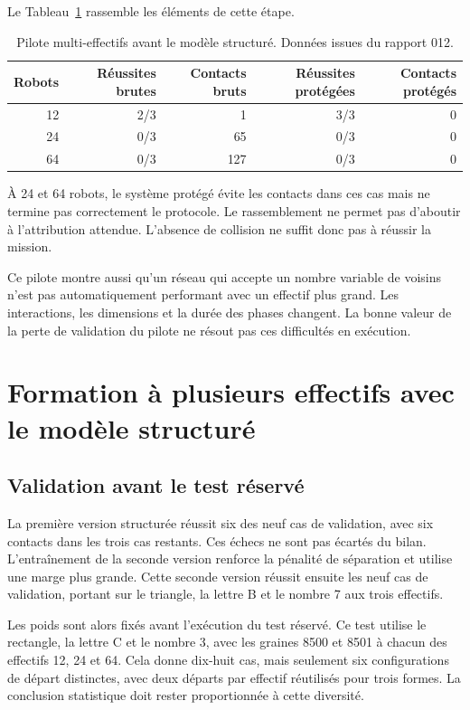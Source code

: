 Le Tableau~\ref{tab:pilote} rassemble les éléments de cette étape.
\begin{table}[htbp]
\caption{Pilote multi-effectifs avant le modèle structuré. Données issues du rapport 012.}
\label{tab:pilote}
\centering
\begin{tabular}{rrrrr}
\toprule
Robots & Réussites brutes & Contacts bruts & Réussites protégées & Contacts protégés\\\midrule
12 & 2/3 & 1 & 3/3 & 0\\
24 & 0/3 & 65 & 0/3 & 0\\
64 & 0/3 & 127 & 0/3 & 0\\\bottomrule
\end{tabular}


\end{table}

À 24 et 64 robots, le système protégé évite les contacts dans ces cas mais ne termine pas correctement le protocole. Le rassemblement ne permet pas d'aboutir à l'attribution attendue. L'absence de collision ne suffit donc pas à réussir la mission.

Ce pilote montre aussi qu'un réseau qui accepte un nombre variable de voisins n'est pas automatiquement performant avec un effectif plus grand. Les interactions, les dimensions et la durée des phases changent. La bonne valeur de la perte de validation du pilote ne résout pas ces difficultés en exécution.

\section{Formation à plusieurs effectifs avec le modèle structuré}
\subsection{Validation avant le test réservé}
La première version structurée réussit six des neuf cas de validation, avec six contacts dans les trois cas restants. Ces échecs ne sont pas écartés du bilan. L'entraînement de la seconde version renforce la pénalité de séparation et utilise une marge plus grande. Cette seconde version réussit ensuite les neuf cas de validation, portant sur le triangle, la lettre B et le nombre 7 aux trois effectifs.

Les poids sont alors fixés avant l'exécution du test réservé. Ce test utilise le rectangle, la lettre C et le nombre 3, avec les graines 8500 et 8501 à chacun des effectifs 12, 24 et 64. Cela donne dix-huit cas, mais seulement six configurations de départ distinctes, avec deux départs par effectif réutilisés pour trois formes. La conclusion statistique doit rester proportionnée à cette diversité.

